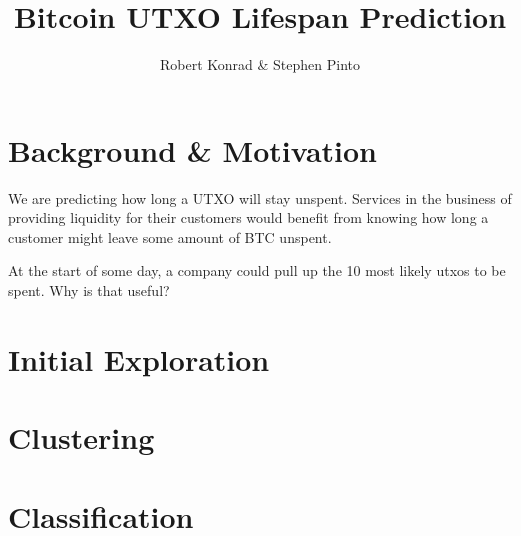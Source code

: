 \documentclass[12pt]{article}
\title{Bitcoin UTXO Lifespan Prediction}
\author{Robert Konrad \& Stephen Pinto}
\begin{document}
\maketitle

\section{Background \& Motivation} %
\label{sec:motivation}
We are predicting how long a UTXO will stay unspent. Services in the business of providing liquidity for their customers would benefit from knowing how long a customer might leave some amount of BTC unspent.

At the start of some day, a company could pull up the 10 most likely utxos to be spent. Why is that useful?

\section{Initial Exploration}


\section{Clustering}

\section{Classification}
\end{document}
